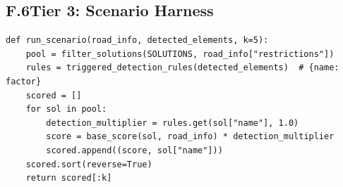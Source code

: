 \documentclass[11pt]{article}
\begin{document}
\subsection*{F.6\quad Tier 3: Scenario Harness}
\begin{verbatim}
def run_scenario(road_info, detected_elements, k=5):
    pool = filter_solutions(SOLUTIONS, road_info["restrictions"])
    rules = triggered_detection_rules(detected_elements)  # {name: factor}
    scored = []
    for sol in pool:
        detection_multiplier = rules.get(sol["name"], 1.0)
        score = base_score(sol, road_info) * detection_multiplier
        scored.append((score, sol["name"]))
    scored.sort(reverse=True)
    return scored[:k]
\end{verbatim}
\end{document}
